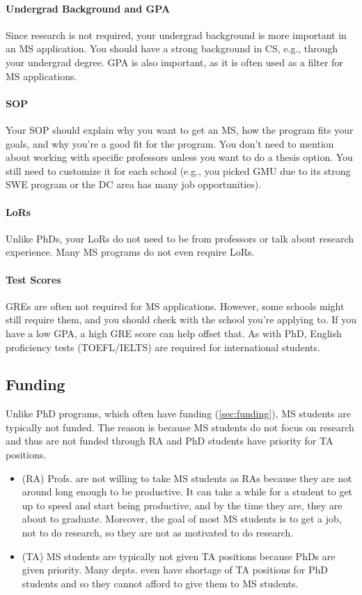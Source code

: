 \documentclass[oneside,11pt,dvipsnames]{book}
\begin{document}
\paragraph{Undergrad Background and GPA} Since research is not required, your undergrad background is more important in an MS application.  You should have a strong background in CS, e.g., through your undergrad degree.  GPA is also important, as it is often used as a filter for MS applications.

\paragraph{SOP} Your SOP should explain why you want to get an MS, how the program fits your goals, and why you're a good fit for the program.  You don't need to mention about working with specific professors unless you want to do a thesis option. You still need to customize it for each school (e.g., you picked GMU due to its strong SWE program or the DC area has many job opportunities).

\paragraph{LoRs} Unlike PhDs, your LoRs do not need to be from professors or talk about research experience. Many MS programs do not even require LoRs.

\paragraph{Test Scores} GREs are often not required for MS applications.  However, some schools might still require them, and you should check with the school you're applying to.  If you have a low GPA, a high GRE score can help offset that. As with PhD, English proficiency tests (TOEFL/IELTS) are required for international students.

\subsection{Funding}\label{sec:ms-funding}
Unlike PhD programs, which often have funding (\autoref{sec:funding}), MS students are typically not funded. The reason is because MS students do not focus on research and thus are not funded through RA and PhD students have priority for TA positions. 
\begin{itemize}
\item (RA) Profs. are not willing to take MS students as RAs because they are not around long enough to be productive. It can take a while for a student to get up to speed and start being productive, and by the time they are, they are about to graduate. Moreover, the goal of most MS students is to get a job, not to do research, so they are not as motivated to do research.
\item (TA) MS students are typically not given TA positions because PhDs are given priority. Many depts. even have shortage of TA positions for PhD students and so they cannot afford to give them to MS students.
\end{itemize}
\end{document}
